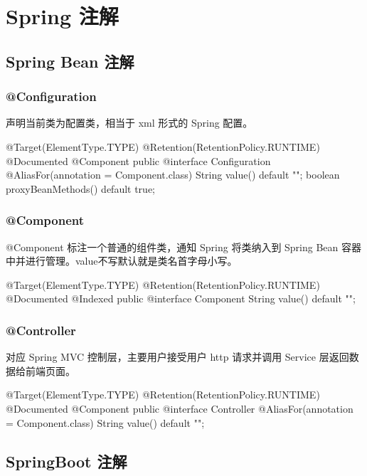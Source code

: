 \section{Spring 注解}
\subsection{Spring Bean 注解}

\subsubsection{@Configuration}

声明当前类为配置类，相当于 xml 形式的 Spring 配置。

\begin{Java}
@Target(ElementType.TYPE)
@Retention(RetentionPolicy.RUNTIME)
@Documented
@Component
public @interface Configuration {
    @AliasFor(annotation = Component.class)
    String value() default "";
    boolean proxyBeanMethods() default true;
}
\end{Java}


\subsubsection{@Component}

@Component 标注一个普通的组件类，通知 Spring 将类纳入到 Spring Bean 容器中并进行管理。value不写默认就是类名首字母小写。

\begin{Java}
@Target(ElementType.TYPE)
@Retention(RetentionPolicy.RUNTIME)
@Documented
@Indexed
public @interface Component {
    String value() default "";
}
\end{Java}

\subsubsection{@Controller}

对应 Spring MVC 控制层，主要用户接受用户 http 请求并调用 Service 层返回数据给前端页面。

\begin{Java}
@Target(ElementType.TYPE)
@Retention(RetentionPolicy.RUNTIME)
@Documented
@Component
public @interface Controller {
    @AliasFor(annotation = Component.class)
    String value() default "";
}
\end{Java}

\subsection{SpringBoot 注解}
